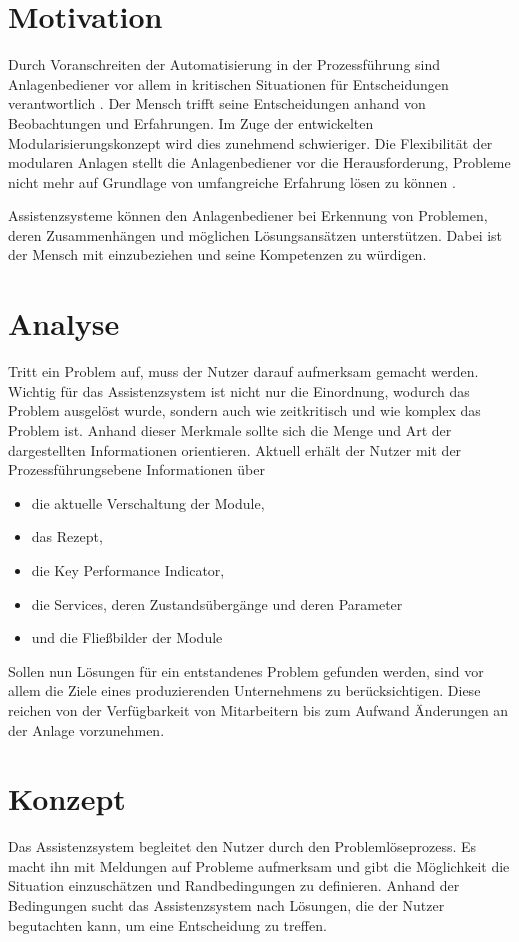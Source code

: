 \documentclass{ifaPoster}
\begin{document}
\section{Motivation}
Durch Voranschreiten der Automatisierung in der Prozessführung sind Anlagenbediener vor allem in kritischen Situationen für Entscheidungen verantwortlich \cite{bainbridget_ironies_1983}. Der Mensch trifft seine Entscheidungen anhand von Beobachtungen und Erfahrungen. Im Zuge der entwickelten Modularisierungskonzept wird dies zunehmend schwieriger. Die Flexibilität der modularen Anlagen stellt die Anlagenbediener vor die Herausforderung, Probleme nicht mehr auf Grundlage von umfangreiche Erfahrung lösen zu können \cite{mueller_2018}.

Assistenzsysteme können den Anlagenbediener bei Erkennung von Problemen, deren Zusammenhängen und möglichen Lösungsansätzen unterstützen. Dabei ist der Mensch mit einzubeziehen und seine Kompetenzen zu würdigen.

\section{Analyse}
Tritt ein Problem auf, muss der Nutzer darauf aufmerksam gemacht werden. Wichtig für das Assistenzsystem ist nicht nur die Einordnung, wodurch das Problem ausgelöst wurde, sondern auch wie zeitkritisch und wie komplex das Problem ist. Anhand dieser Merkmale sollte sich die Menge und Art der dargestellten Informationen orientieren. Aktuell erhält der Nutzer mit der Prozessführungsebene Informationen über
\begin{itemize}
\item die aktuelle Verschaltung der Module,
\item das Rezept,
\item die Key Performance Indicator,
\item die Services, deren Zustandsübergänge und deren Parameter
\item und die Fließbilder der Module
\end{itemize}
Sollen nun Lösungen für ein entstandenes Problem gefunden werden, sind vor allem die Ziele eines produzierenden Unternehmens zu berücksichtigen. Diese reichen von der Verfügbarkeit von Mitarbeitern bis zum Aufwand Änderungen an der Anlage vorzunehmen.

\section{Konzept}
Das Assistenzsystem begleitet den Nutzer durch den Problemlöseprozess. Es macht ihn mit Meldungen auf Probleme aufmerksam und gibt die Möglichkeit die Situation einzuschätzen und Randbedingungen zu definieren. Anhand der Bedingungen sucht das Assistenzsystem nach Lösungen, die der Nutzer begutachten kann, um eine Entscheidung zu treffen.
\end{document}
